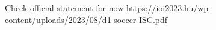 Check official statement for now \url{https://ioi2023.hu/wp-content/uploads/2023/08/d1-soccer-ISC.pdf}